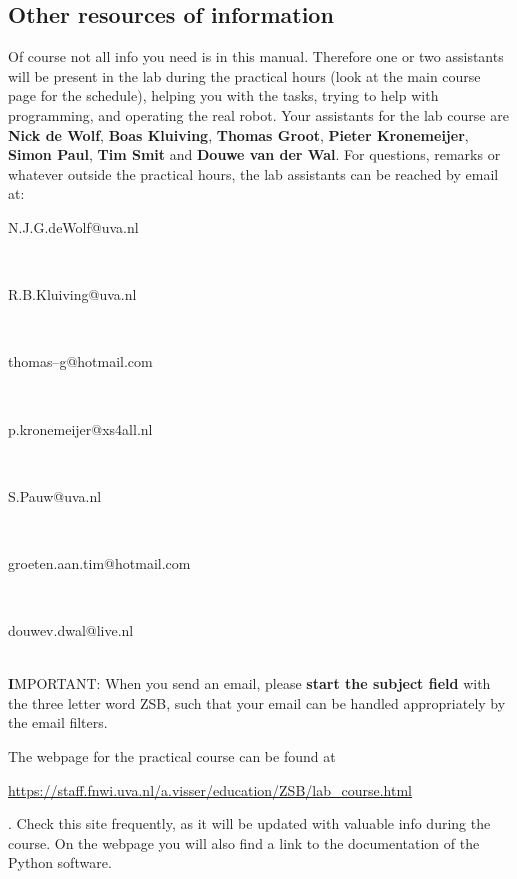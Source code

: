\documentclass[10pt]{scrartcl}
\begin{document}
\subsection{Other resources of information}
Of course not all info you need is in this manual. Therefore one or two 
assistants will be present in the lab during the practical hours (look at
the main course page for the schedule), helping you with the tasks,
trying to help with programming, and operating the real robot. 
Your assistants for the lab course are {\bfseries Nick de Wolf}, {\bfseries Boas Kluiving}, {\bfseries Thomas Groot}, {\bfseries Pieter Kronemeijer}, {\bfseries Simon Paul}, {\bfseries Tim Smit} and {\bfseries Douwe van der Wal}.
For questions, remarks or whatever outside the practical hours, the lab assistants can
be reached by email at:
\\\centerline{{\ttfamily N.J.G.deWolf@uva.nl}}
\\\centerline{{\ttfamily R.B.Kluiving@uva.nl}}
\\\centerline{{\ttfamily thomas--g@hotmail.com}}
\\\centerline{{\ttfamily p.kronemeijer@xs4all.nl}}
\\\centerline{{\ttfamily S.Pauw@uva.nl}}
\\\centerline{{\ttfamily groeten.aan.tim@hotmail.com}}
\\\centerline{{\ttfamily douwev.dwal@live.nl}}
\\


{\textbf IMPORTANT:} When you send an email, please {\bfseries start the subject field} with the
three letter word
{\ttfamily ZSB}, such that your email can be handled appropriately by the 
email filters.

The webpage for the practical course can be found at \\
\centerline{\url{https://staff.fnwi.uva.nl/a.visser/education/ZSB/lab_course.html}}.
Check this site frequently, as it will be
updated with valuable info during the course. 
On the webpage you will also
find a link to the documentation of the Python software.

%

\end{document}
